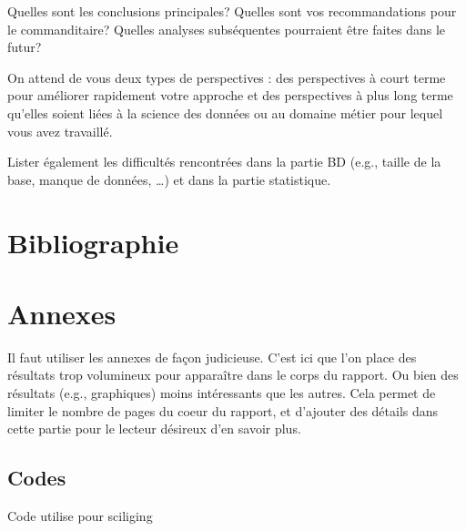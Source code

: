 \documentclass[mstat,12pt]{unswthesis}
\begin{document}
Quelles sont les conclusions principales? Quelles sont vos
recommandations pour le commanditaire? Quelles analyses subséquentes
pourraient être faites dans le futur?

\bigskip

On attend de vous deux types de perspectives : des perspectives à court
terme pour améliorer rapidement votre approche et des perspectives à
plus long terme qu'elles soient liées à la science des données ou au
domaine métier pour lequel vous avez travaillé.

\bigskip

Lister également les difficultés rencontrées dans la partie BD (e.g.,
taille de la base, manque de données, \ldots) et dans la partie
statistique.

\chapter*{Bibliographie}\label{bibliographie}

\label{refs}
\begin{CSLReferences}{0}{1}
\end{CSLReferences}




\chapter*{Annexes}\label{annexes}

Il faut utiliser les annexes de façon judicieuse. C'est ici que l'on
place des résultats trop volumineux pour apparaître dans le corps du
rapport. Ou bien des résultats (e.g., graphiques) moins intéressants que
les autres. Cela permet de limiter le nombre de pages du coeur du
rapport, et d'ajouter des détails dans cette partie pour le lecteur
désireux d'en savoir plus.

\section*{\texorpdfstring{\textbf{Codes}}{Codes}}\label{codes}

\tiny

Code utilise pour sciliging \label{codeR_slicing}
\end{document}
